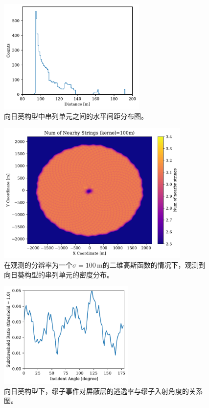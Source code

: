 \begin{figure}[!htb]%
    \centering
    \includegraphics[width=0.65\textwidth]{img/distance_spectrum_sunflower.pdf}
    \caption{向日葵构型中串列单元之间的水平间距分布图。}
    \label{fig:distance_spectrum_sunflower}
\end{figure}

\begin{figure}[!htb]%
    \centering
    \includegraphics[width=0.85\textwidth]{img/string_density_sunflower.pdf}
    \caption{在观测的分辨率为一个$\sigma = 100\,\mathrm{m}$的二维高斯函数的情况下，观测到向日葵构型的串列单元的密度分布。}
    \label{fig:string_density_sunflower}
\end{figure}

\begin{figure}[!htb]%
    \centering
    \includegraphics[width=0.60\textwidth]{img/corridor_angle_sunflower.pdf}
    \caption{向日葵构型下，缪子事件对屏蔽层的逃逸率与缪子入射角度的关系图。}
    \label{fig:corridor_angle_sunflower}
\end{figure}

